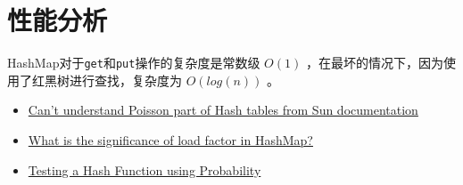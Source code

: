 \documentclass[12pt]{article}
\begin{document}
\section{性能分析}\label{ux6027ux80fdux5206ux6790}

HashMap对于\texttt{get}和\texttt{put}操作的复杂度是常数级 \(\displaystyle{O(1)}\) ，在最坏的情况下，因为使用了红黑树进行查找，复杂度为 \(\displaystyle{O(log(n))}\) 。

\begin{itemize}
\tightlist
\item
  \href{https://stackoverflow.com/questions/20448477/cant-understand-poisson-part-of-hash-tables-from-sun-documentation}{Can't understand Poisson part of Hash tables from Sun documentation}
\item
  \href{https://stackoverflow.com/questions/10901752/what-is-the-significance-of-load-factor-in-hashmap}{What is the significance of load factor in HashMap?}
\item
  \href{http://rabbit.eng.miami.edu/class/een318/poisson.pdf}{Testing a Hash Function using Probability}
\end{itemize}
\end{document}
